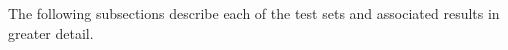 The following subsections describe each of the test sets and associated results in greater detail.






%
%
